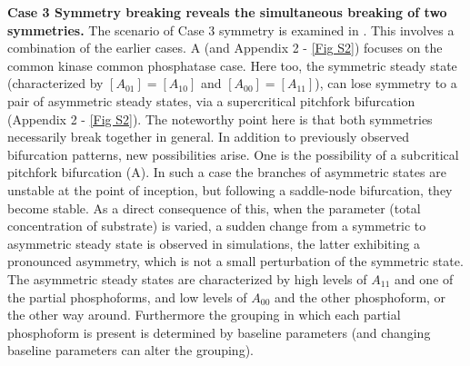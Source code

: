 \documentclass[9pt,lineno]{elife}
\begin{document}
{\bf Case 3 Symmetry breaking reveals the simultaneous breaking of two symmetries.} The scenario of Case 3 symmetry is examined in . This involves a combination of the earlier cases. A (and Appendix 2 - \cref{Fig S2}) focuses on the common kinase common phosphatase case.
Here too, the symmetric steady state (characterized by $[A_{01}] = [A_{10}]$ and $[A_{00}] = [A_{11}]$), can lose symmetry to a pair of asymmetric steady states, via a supercritical pitchfork bifurcation (Appendix 2 - \cref{Fig S2}). The noteworthy point here is that both symmetries necessarily break together in general. In addition to previously observed bifurcation patterns, new possibilities arise. One is the possibility of a subcritical pitchfork bifurcation (A). In such a case the branches of asymmetric states are unstable at the point of inception, but following a saddle-node bifurcation, they become stable. 
As a direct consequence of this, when the parameter (total concentration of substrate) is varied, a sudden change from a symmetric to asymmetric steady state is observed in simulations, the latter exhibiting a pronounced asymmetry, which is not a small perturbation of the symmetric state. 
The asymmetric steady states are characterized by high levels of $A_{11}$ and one of the partial phosphoforms, and low levels of $A_{00}$ and the other phosphoform, or the other way around. Furthermore the grouping in which each partial phosphoform is present is determined by baseline parameters (and changing baseline parameters can alter the grouping).
\end{document}
